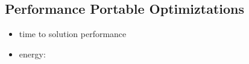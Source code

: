 \subsection{Performance Portable Optimiztations}

\begin{itemize}
    \item time to solution performance
    \item energy: \cite{own_hws_hpo}
\end{itemize}
